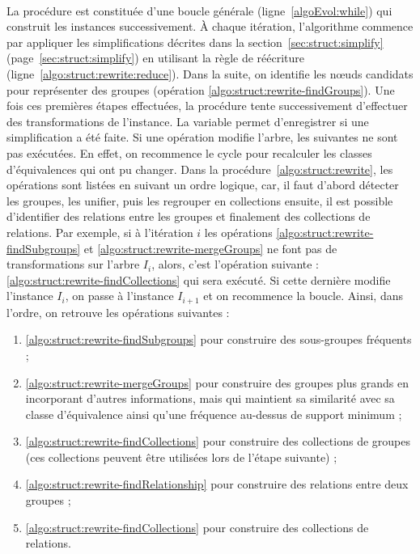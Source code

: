 \paragraph{}
La procédure est constituée d'une boucle générale (ligne~\ref{algoEvol:while}) qui construit les instances successivement.
À chaque itération, l'algorithme commence par appliquer les simplifications décrites dans la section~\ref{sec:struct:simplify} (page~\ref{sec:struct:simplify}) en utilisant la règle de réécriture \reduce (ligne~\ref{algo:struct:rewrite:reduce}).
Dans la suite, on identifie les nœuds candidats pour représenter des groupes (opération \ref{algo:struct:rewrite-findGroups}).
Une fois ces premières étapes effectuées, la procédure tente successivement d'effectuer des transformations de l'instance.
La variable \simp permet d'enregistrer si une simplification a été faite.
Si une opération modifie l'arbre, les suivantes ne sont pas exécutées.
En effet, on recommence le cycle pour recalculer les classes d'équivalences qui ont pu changer.
Dans la  procédure~\ref{algo:struct:rewrite}, les opérations sont listées en suivant un ordre logique, car, il faut d'abord détecter les groupes, les unifier, puis les regrouper en collections ensuite, il est possible d'identifier des relations entre les groupes et finalement des collections de relations.
Par exemple, si à l'itération $i$ les opérations \ref{algo:struct:rewrite-findSubgroups} et \ref{algo:struct:rewrite-mergeGroups} ne font pas de transformations sur l'arbre $I_i$, alors, c'est l'opération suivante : \ref{algo:struct:rewrite-findCollections} qui sera exécuté.
Si cette dernière modifie l'instance $I_i$, on passe à l'instance $I_{i+1}$ et on recommence la boucle.
Ainsi, dans l'ordre, on retrouve les opérations suivantes :
\begin{enumerate}
    \item \ref{algo:struct:rewrite-findSubgroups} pour construire des sous-groupes fréquents ;
    \item \ref{algo:struct:rewrite-mergeGroups} pour construire des groupes plus grands en incorporant d'autres informations, mais qui maintient sa similarité avec sa classe d'équivalence ainsi qu'une fréquence au-dessus de support minimum ;
    \item \ref{algo:struct:rewrite-findCollections} pour construire des collections de groupes (ces collections peuvent être utilisées lors de l'étape suivante) ;
    \item \ref{algo:struct:rewrite-findRelationship} pour construire des relations entre deux groupes ;
    \item \ref{algo:struct:rewrite-findCollections} pour construire des collections de relations.
\end{enumerate}

